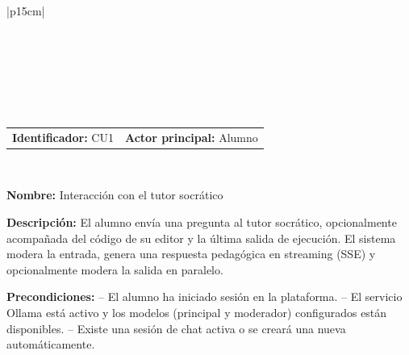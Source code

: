 \begingroup
{} %
\setlength{\arrayrulewidth}{1pt}
\begin{longtable}{|p{15cm}|}
  
  \hline
   \\
  \hline
  \endfirsthead
  
   \\
  \hline
   \\
  \hline
  \endhead
  
  \hline {} \\ \hline
  \endfoot
  
  \hline
  \caption{Caso de uso 1 — Interacción con el tutor socrático.}
  \label{TB:CU1_TUTOR}
  \endlastfoot

  \begin{tabularx}{\linewidth}{@{}X X@{}}
    \textbf{Identificador:} CU1 & \textbf{Actor principal:} Alumno 
  \end{tabularx} \\ \hline

  \textbf{Nombre:} Interacción con el tutor socrático \\ \hline

  \textbf{Descripción:} \newline 
  El alumno envía una pregunta al tutor socrático, opcionalmente acompañada del código de su editor y la última salida de ejecución. El sistema modera la entrada, genera una respuesta pedagógica en streaming (SSE) y opcionalmente modera la salida en paralelo. \\ \hline

  \textbf{Precondiciones:} \newline
  -- El alumno ha iniciado sesión en la plataforma. \newline
  -- El servicio Ollama está activo y los modelos (principal y moderador) configurados están disponibles. \newline
  -- Existe una sesión de chat activa o se creará una nueva automáticamente. \\ \hline


\end{longtable}
